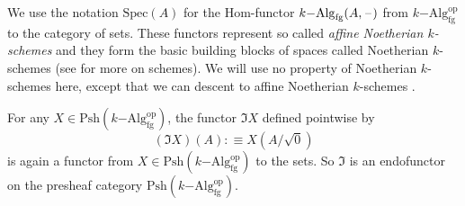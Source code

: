 \documentclass[9pt,twosided]{amsart}
\newcommand{\Spec}{\ensuremath{\mathrm{Spec}}}
\begin{document}
We use the notation $\Spec(A)$ for the Hom-functor $k\mathrm{-Alg}_{\mathrm{fg}}(A,\mathord{\hspace{1pt}\text{--}\hspace{1pt}})$ from $k\mathrm{-Alg}^{\mathrm{op}}_{\mathrm{fg}}$ to the category of sets.
These functors represent so called \emph{affine Noetherian $k$-schemes} and they form the basic building blocks of spaces called Noetherian $k$-schemes
(see \cite[Chapter II]{hartshorne} for more on schemes).
We will use no property of Noetherian $k$-schemes here,
except that we can descent to affine Noetherian $k$-schemes .

For any $X\in\mathrm{Psh}(k\mathrm{-Alg}^\mathrm{op}_{\mathrm{fg}})$,
the functor $\Im X$ defined pointwise by
\[ (\Im X)(A):\equiv X(A/\sqrt{0})\]
is again a functor from $X\in\mathrm{Psh}(k\mathrm{-Alg}^\mathrm{op}_{\mathrm{fg}})$ to the sets.
So $\Im$ is an endofunctor on the presheaf category $\mathrm{Psh}(k\mathrm{-Alg}^\mathrm{op}_{\mathrm{fg}})$.
\end{document}
